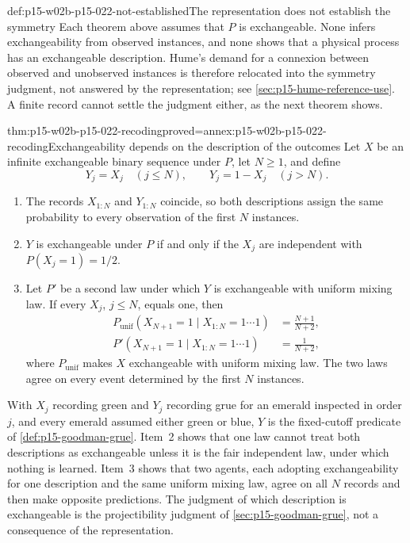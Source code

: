 \begin{hbwarning}{def:p15-w02b-p15-022-not-established}{The representation does not establish the symmetry}
Each theorem above assumes that \(P\) is exchangeable. None infers
exchangeability from observed instances, and none shows that a physical
process has an exchangeable description. Hume's demand for a connexion
between observed and unobserved instances is therefore relocated into the
symmetry judgment, not answered by the representation; see
\cref{sec:p15-hume-reference-use}. A finite record cannot settle the
judgment either, as the next theorem shows.
\end{hbwarning}

\begin{hbtheorem}{thm:p15-w02b-p15-022-recoding}{proved=annex:p15-w02b-p15-022-recoding}{Exchangeability depends on the description of the outcomes}
Let \(X\) be an infinite exchangeable binary sequence under \(P\), let
\(N\geq1\), and define
\[
 Y_j=X_j\quad(j\leq N),\qquad Y_j=1-X_j\quad(j>N).
\]
\begin{enumerate}
\item The records \(X_{1:N}\) and \(Y_{1:N}\) coincide, so both descriptions
      assign the same probability to every observation of the first \(N\)
      instances.
\item \(Y\) is exchangeable under \(P\) if and only if the \(X_j\) are
      independent with \(P(X_j=1)=1/2\).
\item Let \(P'\) be a second law under which \(Y\) is exchangeable with
      uniform mixing law. If every \(X_j\), \(j\leq N\), equals one, then
      \[
       \begin{aligned}
       P_{\mathrm{unif}}(X_{N+1}=1\mid X_{1:N}=1\cdots1)&=\frac{N+1}{N+2},\\
       P'(X_{N+1}=1\mid X_{1:N}=1\cdots1)&=\frac1{N+2},
       \end{aligned}
      \]
      where \(P_{\mathrm{unif}}\) makes \(X\) exchangeable with uniform
      mixing law. The two laws agree on every event determined by the first
      \(N\) instances.
\end{enumerate}
\end{hbtheorem}

With \(X_j\) recording green and \(Y_j\) recording grue for an emerald
inspected in order \(j\), and every emerald assumed either green or blue,
\(Y\) is the fixed-cutoff predicate of \cref{def:p15-goodman-grue}. Item~2
shows that one law cannot treat both descriptions as exchangeable unless it
is the fair independent law, under which nothing is learned. Item~3 shows
that two agents, each adopting exchangeability for one description and the
same uniform mixing law, agree on all \(N\) records and then make opposite
predictions. The judgment of which description is exchangeable is the
projectibility judgment of \cref{sec:p15-goodman-grue}, not a consequence of
the representation.

